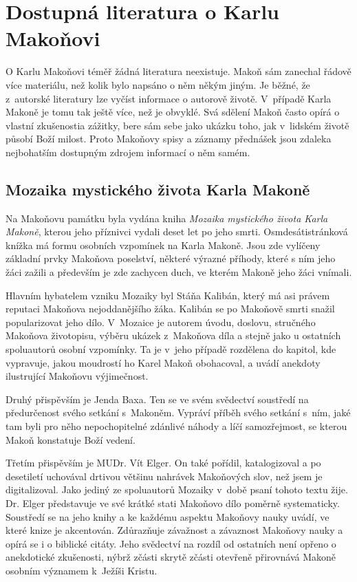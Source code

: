 \chapter{Dostupná literatura o Karlu Makoňovi}

O Karlu Makoňovi téměř žádná literatura neexistuje. Makoň sám zanechal řádově
více materiálu, než kolik bylo napsáno o něm někým jiným. Je běžné, že
z~autorské literatury lze vyčíst informace o autorově životě. V~případě Karla
Makoně je tomu tak ještě více, než je obvyklé. Svá sdělení Makoň často opírá o
vlastní zkušenostia zážitky, bere sám sebe jako ukázku toho, jak v~lidském
životě působí Boží milost. Proto Makoňovy spisy a záznamy přednášek jsou zdaleka
nejbohatším dostupným zdrojem informací o něm samém.

\section{Mozaika mystického života Karla Makoně}

Na Makoňovu památku byla vydána
kniha \textit{Mozaika mystického života Karla Makoně}\cite{mozaikaKM}, kterou
jeho příznivci vydali deset let po jeho smrti.
Osmdesátistránková knížka má formu osobních vzpomínek na Karla Makoně. Jsou zde
vylíčeny základní prvky Makoňova poselství, některé výrazné příhody, které s ním
jeho žáci zažili a především je zde zachycen duch, ve kterém Makoně jeho žáci
vnímali.

Hlavním hybatelem vzniku Mozaiky byl Stáňa Kalibán, který má asi právem reputaci
Makoňova nejoddanějšího žáka. Kalibán se po Makoňově smrti snažil popularizovat
jeho dílo. V~Mozaice je autorem úvodu, doslovu, stručného Makoňova životopisu,
výběru ukázek z~Makoňova díla a stejně jako u ostatních spoluautorů osobní
vzpomínky. Ta je v~jeho případě rozdělena do kapitol, kde vypravuje, jakou
moudrostí ho Karel Makoň obohacoval, a uvádí anekdoty ilustrující Makoňovu
výjimečnost.

Druhý přispěvším je Jenda Baxa. Ten se ve svém svědectví soustředí na
předurčenost svého setkání s~Makoněm. Vypráví příběh svého setkání s~ním, jaké
tam byli pro něho nepochopitelné zdánlivé náhody a líčí samozřejmost, se kterou
Makoň konstatuje Boží vedení.

Třetím přispěvším je MUDr. Vít Elger. On také pořídil, katalogizoval a po
desetiletí uchovával drtivou většinu nahrávek Makoňových slov, než jsem je
digitalizoval. Jako jediný ze spoluautorů Mozaiky v~době psaní tohoto textu
žije. Dr. Elger představuje ve své krátké stati Makoňovo dílo poměrně
systematicky. Soustředí se na jeho knihy a ke každému aspektu Makoňovy nauky
uvádí, ve které knize je akcentován. Zdůrazňuje závažnost a závaznost Makoňovy
nauky a opírá se i o biblické citáty. Jeho svědectví na rozdíl od ostatních není
opřeno o anekdotické zkušenosti, nýbrž zčásti skrytě zčásti otevřeně přirovnává
Makoně osobním významem k~Ježíši Kristu.

